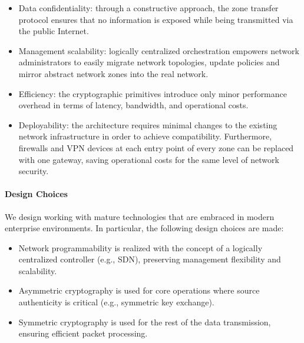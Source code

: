 \begin{itemize}
	\item Data confidentiality: through a constructive approach, the zone transfer
	      protocol ensures that no information
	      is exposed while being transmitted via the public Internet.
	\item Management scalability: logically centralized orchestration empowers
	      network administrators to easily migrate network topologies, update policies and
	      mirror abstract network zones into the real network.
	\item Efficiency: the cryptographic primitives introduce only minor performance
	      overhead in terms of latency, bandwidth, and operational costs.
	\item Deployability: the \name architecture requires minimal changes to the
	      existing network infrastructure in order to achieve compatibility. Furthermore,
	      firewalls and VPN devices
	      at each entry point of every zone can be replaced with one \name gateway, saving
	      operational costs for the same level of network security.
\end{itemize}


\paragraph{Design Choices}
We design \name working with mature technologies that are embraced in modern enterprise
environments. In particular, the following design choices are made:

\begin{itemize}
	\item Network programmability is realized with the concept of a logically centralized
	      controller (e.g., SDN), preserving management flexibility and scalability.
	\item Asymmetric cryptography is used for core operations where source
	      authenticity is critical (e.g., symmetric key exchange).
	\item Symmetric cryptography is used for the rest of the data
	      transmission, ensuring efficient packet processing.
\end{itemize}

